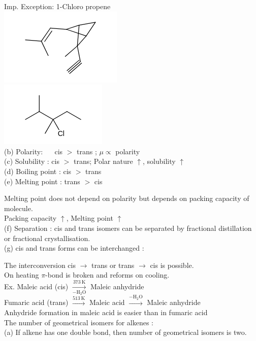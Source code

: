 \documentclass[10pt]{article}
\begin{document}
Imp. Exception: 1-Chloro propene\\
\includegraphics{smile-1d7d05130551dc1fbd5537e2ca63e8444ef2e144}\\
\includegraphics{smile-166ae09635d0dd95bab807b883c50cbfe1a54f27}\\
(b) Polarity: $\quad$ cis $>$ trans ; $\mu \propto$ polarity\\
(c) Solubility : cis $>$ trans; Polar nature $\uparrow$, solubility $\uparrow$\\
(d) Boiling point : cis $>$ trans\\
(e) Melting point : trans $>$ cis

Melting point does not depend on polarity but depends on packing capacity of molecule.\\
Packing capacity $\uparrow$, Melting point $\uparrow$\\
(f) Separation : cis and trans isomers can be separated by fractional distillation or fractional crystallisation.\\
(g) cis and trans forms can be interchanged :

The interconversion cis $\rightarrow$ trans or trans $\rightarrow$ cis is possible.\\
On heating $\pi$-bond is broken and reforms on cooling.\\
Ex. Maleic acid (cis) $\xrightarrow[-\mathrm{H}_{2} \mathrm{O}]{373 \mathrm{~K}}$ Maleic anhydride\\
Fumaric acid (trans) $\xrightarrow{513 \mathrm{~K}}$ Maleic acid $\xrightarrow{-\mathrm{H}_{2} \mathrm{O}}$ Maleic anhydride\\
Anhydride formation in maleic acid is easier than in fumaric acid\\
The number of geometrical isomers for alkenes :\\
(a) If alkene has one double bond, then number of geometrical isomers is two.
\end{document}
